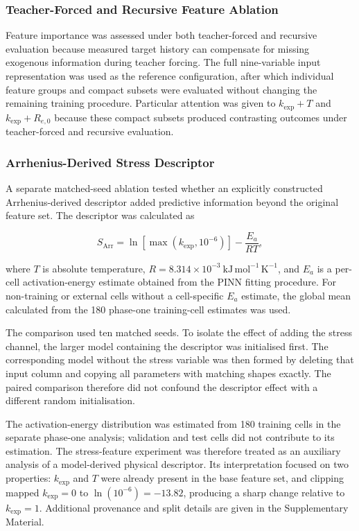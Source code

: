 \documentclass[a4paper,fleqn]{cas-sc}
\begin{document}
\subsubsection{Teacher-Forced and Recursive Feature Ablation}
\label{sec:feature_ablation_protocol}

Feature importance was assessed under both teacher-forced and recursive evaluation because measured target history can compensate for missing exogenous information during teacher forcing. The full nine-variable input representation was used as the reference configuration, after which individual feature groups and compact subsets were evaluated without changing the remaining training procedure. Particular attention was given to $k_{\mathrm{exp}}+T$ and $k_{\mathrm{exp}}+R_{e,0}$ because these compact subsets produced contrasting outcomes under teacher-forced and recursive evaluation.

\subsubsection{Arrhenius-Derived Stress Descriptor}
\label{sec:stress_protocol}

A separate matched-seed ablation tested whether an explicitly constructed Arrhenius-derived descriptor added predictive information beyond the original feature set. The descriptor was calculated as

\begin{equation}
S_{\mathrm{Arr}}
=
\ln
\left[
\max
\left(
k_{\mathrm{exp}},10^{-6}
\right)
\right]
-
\frac{E_a}
{RT},
\label{eq:stress_descriptor}
\end{equation}

where $T$ is absolute temperature, \(R=8.314\times10^{-3}~\mathrm{kJ\,mol^{-1}\,K^{-1}}\), and $E_a$ is a per-cell activation-energy estimate obtained from the PINN fitting procedure. For non-training or external cells without a cell-specific $E_a$ estimate, the global mean calculated from the 180 phase-one training-cell estimates was used.

The comparison used ten matched seeds. To isolate the effect of adding the stress channel, the larger model containing the descriptor was initialised first. The corresponding model without the stress variable was then formed by deleting that input column and copying all parameters with matching shapes exactly. The paired comparison therefore did not confound the descriptor effect with a different random initialisation.

The activation-energy distribution was estimated from 180 training cells in the separate phase-one analysis; validation and test cells did not contribute to its estimation. The stress-feature experiment was therefore treated as an auxiliary analysis of a model-derived physical descriptor. Its interpretation focused on two properties: $k_{\mathrm{exp}}$ and $T$ were already present in the base feature set, and clipping mapped $k_{\mathrm{exp}}=0$ to $\ln(10^{-6})=-13.82$, producing a sharp change relative to $k_{\mathrm{exp}}=1$. Additional provenance and split details are given in the Supplementary Material.
\end{document}
